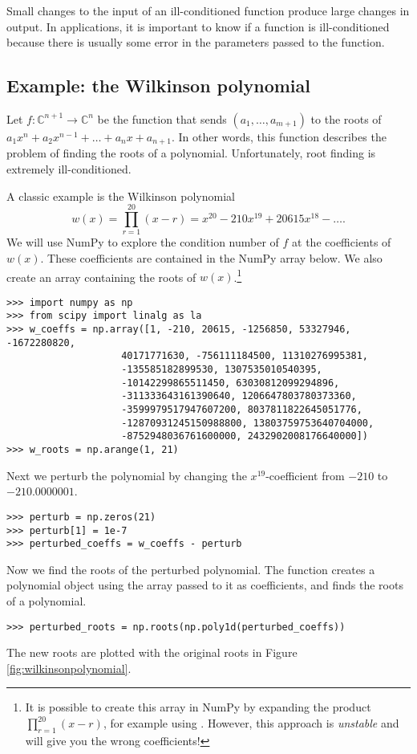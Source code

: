Small changes to the input of an ill-conditioned function produce large changes in output.
In applications, it is important to know if a function is ill-conditioned because there is usually some error in the parameters passed to the function.

\subsection*{Example: the Wilkinson polynomial}
Let $f:\mathbb{C}^{n+1} \rightarrow \mathbb{C}^n$ be the function that sends $(a_1, \ldots, a_{m+1})$ to the roots of $a_1x^n+a_2x^{n-1}+\ldots+a_nx+a_{n+1}$.
In other words, this function describes the problem of finding the roots of a polynomial.
Unfortunately, root finding is extremely ill-conditioned.

A classic example is the Wilkinson polynomial
\[
w(x) = \prod_{r=1}^{20}(x-r) = x^{20}-210x^{19}+20615x^{18}-\ldots.
\]
We will use NumPy to explore the condition number of $f$ at the coefficients of $w(x)$.
These coefficients are contained in the NumPy array  below.
We also create an array  containing the roots of $w(x)$.\footnote{
It is possible to create this array in NumPy by expanding the product $\prod_{r=1}^{20}(x-r)$, for example using .
However, this approach is \emph{unstable} and will give you the wrong coefficients!}
\begin{lstlisting}
>>> import numpy as np
>>> from scipy import linalg as la
>>> w_coeffs = np.array([1, -210, 20615, -1256850, 53327946, -1672280820,
                    40171771630, -756111184500, 11310276995381,
                    -135585182899530, 1307535010540395,
                    -10142299865511450, 63030812099294896,
                    -311333643161390640, 1206647803780373360,
                    -3599979517947607200, 8037811822645051776,
                    -12870931245150988800, 13803759753640704000,
                    -8752948036761600000, 2432902008176640000])
>>> w_roots = np.arange(1, 21)
\end{lstlisting}

Next we perturb the polynomial by changing the $x^{19}$-coefficient from $-210$ to $-210.0000001$.
\begin{lstlisting}
>>> perturb = np.zeros(21)
>>> perturb[1] = 1e-7
>>> perturbed_coeffs = w_coeffs - perturb
\end{lstlisting}

Now we find the roots of the perturbed polynomial.
The function  creates a polynomial object using the array passed to it as coefficients, and  finds the roots of a polynomial.
\begin{lstlisting}
>>> perturbed_roots = np.roots(np.poly1d(perturbed_coeffs))
\end{lstlisting}
The new roots are plotted with the original roots in Figure \ref{fig:wilkinsonpolynomial}.

